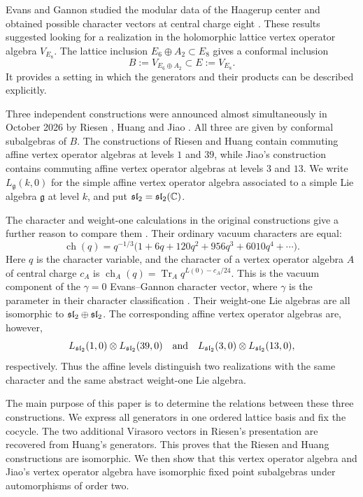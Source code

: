 \documentclass[11pt,reqno]{amsart}
\theoremstyle{definition}\newtheorem{definition}[theorem]{Definition}
\theoremstyle{remark}\newtheorem{remark}[theorem]{Remark}
\newcommand{\C}{\mathbb C}\newcommand{\Z}{\mathbb Z}\newcommand{\Q}{\mathbb Q}
\numberwithin{equation}{section}
\begin{document}
Evans and Gannon studied the modular data of the Haagerup center and obtained possible character vectors at central charge eight \cite{EG}. These results suggested looking for a realization in the holomorphic lattice vertex operator algebra $V_{E_8}$. The lattice inclusion $E_6\oplus A_2\subset E_8$ gives a conformal inclusion
\[
 B:=V_{E_6\oplus A_2}\subset E:=V_{E_8}.
\]
It provides a setting in which the generators and their products can be described explicitly.

Three independent constructions were announced almost simultaneously in October 2026 by Riesen \cite{Riesen,RiesenLong}, Huang \cite{Huang} and Jiao \cite{Jiao}. All three are given by conformal subalgebras of $B$. The constructions of Riesen and Huang contain commuting affine vertex operator algebras at levels $1$ and $39$, while Jiao's construction contains commuting affine vertex operator algebras at levels $3$ and $13$. We write $L_{\mathfrak g}(k,0)$ for the simple affine vertex operator algebra associated to a simple Lie algebra $\mathfrak g$ at level $k$, and put $\slc=\mathfrak{sl}_2(\C)$.

The character and weight-one calculations in the original constructions give a further reason to compare them \cite{Huang,Jiao}. Their ordinary vacuum characters are equal:
\begin{equation}\label{eq:commoncharacter}
 \operatorname{ch}(q)=q^{-1/3}
 \bigl(1+6q+120q^2+956q^3+6010q^4+\cdots\bigr).
\end{equation}
Here $q$ is the character variable, and the character of a vertex operator algebra $A$ of central charge $c_A$ is $\operatorname{ch}_A(q)=\operatorname{Tr}_A q^{L(0)-c_A/24}$. This is the vacuum component of the $\gamma=0$ Evans--Gannon character vector, where $\gamma$ is the parameter in their character classification \cite{EG}. Their weight-one Lie algebras are all isomorphic to $\mathfrak{sl}_2\oplus\mathfrak{sl}_2$. The corresponding affine vertex operator algebras are, however,
\[
 L_{\mathfrak{sl}_2}(1,0)\otimes L_{\mathfrak{sl}_2}(39,0)
 \quad\text{and}\quad
 L_{\mathfrak{sl}_2}(3,0)\otimes L_{\mathfrak{sl}_2}(13,0),
\]
respectively. Thus the affine levels distinguish two realizations with the same character and the same abstract weight-one Lie algebra.

The main purpose of this paper is to determine the relations between these three constructions. We express all generators in one ordered lattice basis and fix the cocycle. The two additional Virasoro vectors in Riesen's presentation are recovered from Huang's generators. This proves that the Riesen and Huang constructions are isomorphic. We then show that this vertex operator algebra and Jiao's vertex operator algebra have isomorphic fixed point subalgebras under automorphisms of order two.
\end{document}
